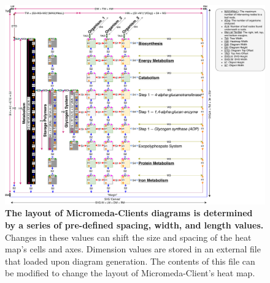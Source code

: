 \begin{figure}[!ht]
  \centering
	\includegraphics[width=\textwidth]{media/diagram_measurements.pdf}
	 \caption[The layout of Micromeda-Clients diagrams is determined by a series of 
pre-defined spacing, width, and length values.]{\textbf{The layout of 
Micromeda-Clients diagrams is determined by a series of pre-defined spacing, 
width, and length values.} Changes in these values can shift the size and 
spacing of the heat map's cells and axes. Dimension values are stored in an 
external file that loaded upon diagram generation. The contents of this file can 
be modified to change the layout of Micromeda-Client's heat map.}
	 \label{fig:diagram-measurements}
\end{figure}

